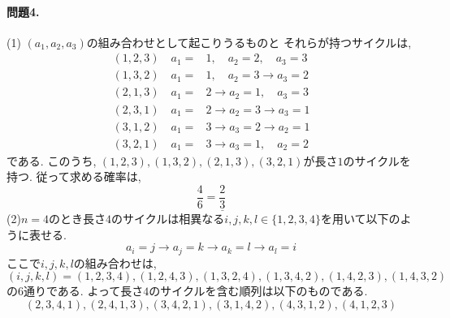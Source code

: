 \documentclass[11pt]{jarticle}
\begin{document}
\title{}
\date{}
\maketitle
\paragraph{問題4.}
(1) $(a_1, a_2, a_3)$の組み合わせとして起こりうるものと
それらが持つサイクルは, 
\begin{align*}
  (1, 2, 3) \quad a_1=& 1,\quad a_2= 2,\quad a_3= 3 \\
  (1, 3, 2) \quad a_1=& 1,\quad a_2= 3 \to a_3= 2 \\
  (2, 1, 3) \quad a_1=& 2 \to a_2= 1,\quad a_3= 3 \\
  (2, 3, 1) \quad a_1=& 2 \to a_2= 3 \to a_3= 1 \\
  (3, 1, 2) \quad a_1=& 3 \to a_3= 2 \to a_2= 1 \\
  (3, 2, 1) \quad a_1=& 3 \to a_3= 1,\quad a_2= 2
\end{align*}
である. このうち, $(1,2,3), (1,3,2), (2,1,3), (3,2,1)$が長さ$1$のサイクルを持つ. 
従って求める確率は, 
\begin{equation*}
  \frac{4}{6} = \underline{\frac{2}{3}}
\end{equation*}
(2)$n = 4$のとき長さ$4$のサイクルは相異なる$i, j, k, l \in \{ 1, 2, 3, 4 \}$を用いて以下のように表せる. 
\begin{equation*}
  a_{i} = j \to a_{j} = k \to a_{k} = l \to a_{l} = i
\end{equation*}
ここで$ i, j, k, l $の組み合わせは, 
\begin{equation*}
  (i, j, k, l) = (1, 2, 3, 4), (1, 2, 4, 3), (1, 3, 2, 4), (1, 3, 4, 2), (1, 4, 2, 3), (1, 4, 3, 2)
\end{equation*}
の6通りである. よって長さ$4$のサイクルを含む順列は以下のものである. 
\begin{equation*}
  (2, 3, 4, 1), (2, 4, 1, 3), (3, 4, 2, 1), (3, 1, 4, 2), (4, 3, 1, 2), (4, 1, 2, 3) 
\end{equation*}
\end{document}
